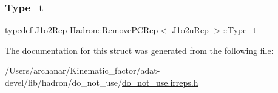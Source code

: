\mbox{\label{structHadron_1_1RemovePCRep_3_01J1o2uRep_01_4_a3bd356cdbefa21f279a298dcc9872b6a}} 
\subsubsection{\texorpdfstring{Type\_t}{Type\_t}\hspace{0.1cm}{\footnotesize\ttfamily [2/2]}}
{\footnotesize\ttfamily typedef \mbox{\hyperlink{structHadron_1_1J1o2Rep}{J1o2\+Rep}} \mbox{\hyperlink{structHadron_1_1RemovePCRep}{Hadron\+::\+Remove\+P\+C\+Rep}}$<$ \mbox{\hyperlink{structHadron_1_1J1o2uRep}{J1o2u\+Rep}} $>$\+::\mbox{\hyperlink{structHadron_1_1RemovePCRep_3_01J1o2uRep_01_4_a3bd356cdbefa21f279a298dcc9872b6a}{Type\+\_\+t}}}



The documentation for this struct was generated from the following file\+:\begin{DoxyCompactItemize}
\item 
/\+Users/archanar/\+Kinematic\+\_\+factor/adat-\/devel/lib/hadron/do\+\_\+not\+\_\+use/\mbox{\hyperlink{adat-devel_2lib_2hadron_2do__not__use_2do__not__use_8irreps_8h}{do\+\_\+not\+\_\+use.\+irreps.\+h}}\end{DoxyCompactItemize}
